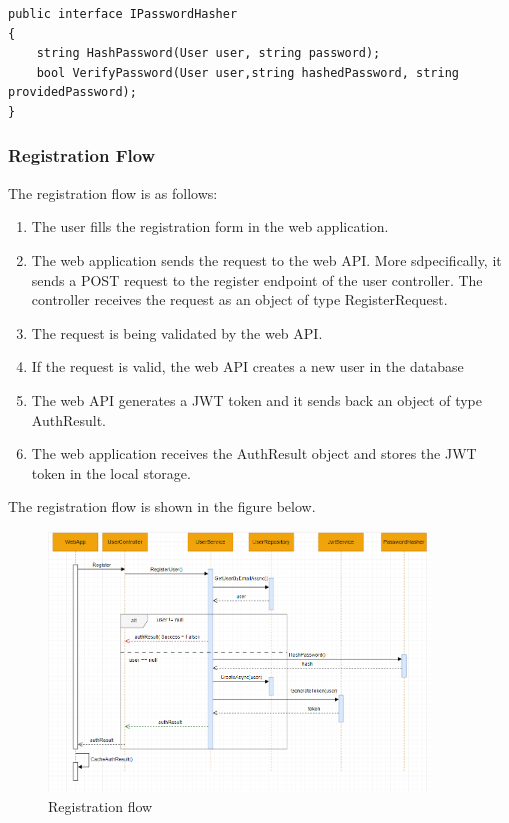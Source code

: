 \begin{lstlisting}[caption={Password Hasher interface}]
public interface IPasswordHasher
{
    string HashPassword(User user, string password);
    bool VerifyPassword(User user,string hashedPassword, string providedPassword);
}
\end{lstlisting}

\subsubsection{Registration Flow}
The registration flow is as follows:
\begin{enumerate}
    \item The user fills the registration form in the web application.
    \item The web application sends the request to the web API. More sdpecifically, 
    it sends a POST request to the register endpoint of the user controller. The controller
    receives the request as an object of type RegisterRequest.
    \item The request is being validated by the web API.
    \item If the request is valid, the web API creates a new user in the database
    \item The web API generates a JWT token and it sends back an object of type AuthResult.
    \item The web application receives the AuthResult object and stores the JWT token in the local storage.
\end{enumerate}

The registration flow is shown in the figure below.
\begin{figure}[H]
    \centering
    \includegraphics[width=0.9\textwidth]{images/registration-flow.png}
    \caption{Registration flow}
    \label{fig:registration-flow}
\end{figure}

